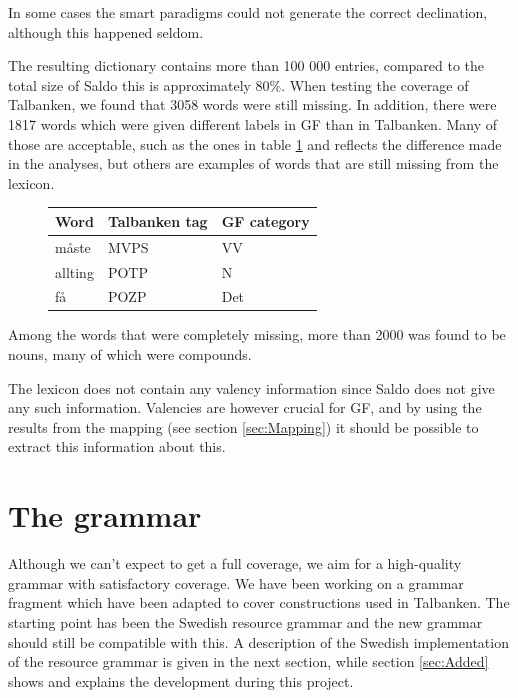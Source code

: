 \documentclass{report}
\begin{document}
In some cases the smart paradigms could not generate the correct declination,
although this happened seldom. %

The resulting dictionary contains more than 100 000 entries, compared to the total size
of Saldo this is approximately 80\%. When testing the coverage of Talbanken,
we found that 3058 words were still missing. In addition, there were 1817 words
which were given different labels in GF than in Talbanken. Many of those are
acceptable, such as the ones in table \ref{tab:saldodiff} and reflects the difference 
made in the analyses, but others are examples of words that are still missing from
the lexicon.
\begin{figure}[h]
\begin{tabular}{lll}
Word & Talbanken tag & GF category \\
\hline
måste & MVPS          & VV \\
allting & POTP & N \\
få & POZP & Det \\
\end{tabular}
\caption{}
\label{tab:saldodiff}
\end{figure}
Among the words that were completely missing, more than 2000 was found to be nouns,
many of which were compounds. 

The lexicon does not contain any valency information since Saldo does not give any such
information. Valencies are however crucial for GF, and by using the results from the mapping
(see section \ref{sec:Mapping}) it should be possible to extract this information about this.


\section{The grammar}
\label{sec:prog.grammar}
Although we can't expect to get a full coverage, we aim for a high-quality 
grammar with satisfactory coverage.
We have been working on a grammar fragment which have been adapted to cover
constructions used in Talbanken. The starting point has been the Swedish
resource grammar and the new grammar should still be compatible with this.
A description of the Swedish implementation of the resource grammar is given
in the next section, while section \ref{sec:Added} shows and explains the
development during this project.
\end{document}
